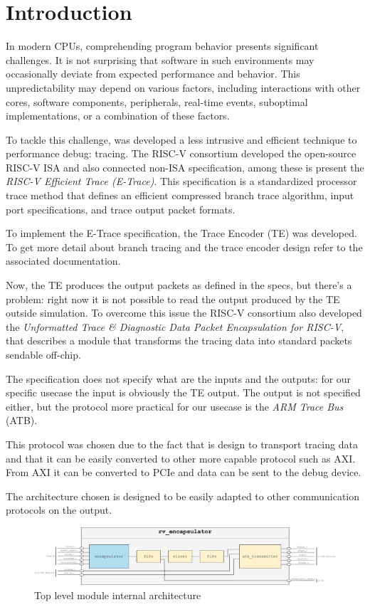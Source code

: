 \chapter{Introduction}\label{intro}

In modern CPUs, comprehending program behavior presents significant challenges. It is not 
surprising that software in such environments may occasionally deviate from expected performance 
and behavior. 
This unpredictability may depend on various factors, including interactions with other cores, 
software components, peripherals, real-time events, suboptimal implementations, or a combination 
of these factors.

To tackle this challenge, was developed a less intrusive and efficient technique to performance 
debug: tracing.
The RISC-V consortium developed the open-source RISC-V ISA and also connected non-ISA 
specification, among these is present the \textit{RISC-V Efficient Trace (E-Trace)}. This 
specification is a standardized processor trace method that defines an efficient compressed 
branch trace algorithm, input port specifications, and trace output packet formats. 

To implement the E-Trace specification, the Trace Encoder (TE) was developed.
To get more detail about branch tracing and the trace encoder design refer to the associated 
documentation.

Now, the TE produces the output packets as defined in the specs, but there's a problem: right now 
it is not possible to read the output produced by the TE outside simulation. To overcome this 
issue the RISC-V consortium also developed the \textit{Unformatted Trace \& Diagnostic Data 
Packet Encapsulation for RISC-V}, that describes a module that transforms the tracing data into standard 
packets sendable off-chip. 

The specification does not specify what are the inputs and the outputs: for our specific usecase 
the input is obviously the TE output. The output is not specified either, but the protocol more 
practical for our usecase is the \textit{ARM Trace Bus} (ATB).

This protocol was chosen due to the fact that is design to transport tracing data and that it can 
be easily converted to other more capable protocol such as AXI. From AXI it can be converted to 
PCIe and data can be sent to the debug device.

The architecture chosen is designed to be easily adapted to other communication protocols on the output.

\begin{figure}[H]
    \centering
    \includegraphics[width=1\textwidth]{img/rv_encapsulator.pdf}
    \caption{Top level module internal architecture}
    \label{fig:rv_encapsulator_architecture}
\end{figure}